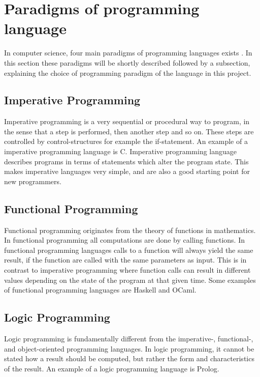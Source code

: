 \section{Paradigms of programming language}
In computer science, four main paradigms of programming languages exists \citep{ProgrammingParadigms}. In this section these paradigms will be shortly described followed by a subsection, explaining the choice of programming paradigm of the language in this project.

\subsection{Imperative Programming}
Imperative programming is a very sequential or procedural way to program, in the sense that a step is performed, then another step and so on. These steps are controlled by control-structures for example the if-statement. An example of a imperative programming language is C. Imperative programming language describes programs in terms of statements which alter the program state. This makes imperative languages very simple, and are also a good starting point for new programmers.

\subsection{Functional Programming}
Functional programming originates from the theory of functions in mathematics. In functional programming all computations are done by calling functions. In functional programming languages calls to a function will always yield the same result, if the function are called with the same parameters as input. This is in contrast to imperative programming where function calls can result in different values depending on the state of the program at that given time. Some examples of functional programming languages are Haskell and OCaml.

\subsection{Logic Programming}
Logic programming is fundamentally different from the imperative-, functional-, and object-oriented programming languages. In logic programming, it cannot be stated how a result should be computed, but rather the form and characteristics of the result. An example of a logic programming language is Prolog.

